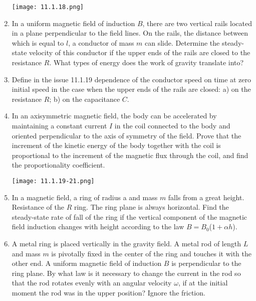 \documentclass{article}
\begin{document}
\begin{enumerate}[label=11.1.\arabic*]
\begin{center}
    \texttt{[image: 11.1.18.png]}
\end{center}

\item In a uniform magnetic field of induction $B$, there are two vertical rails located in a plane perpendicular to the field lines. On the rails, the distance between which is equal to $l$, a conductor of mass $m$ can slide. Determine the steady-state velocity of this conductor if the upper ends of the rails are closed to the resistance $R$. What types of energy does the work of gravity translate into?

\item Define in the issue 11.1.19 dependence of the conductor speed on time at zero initial speed in the case when the upper ends of the rails are closed: a) on the resistance $R$; b) on the capacitance $C$.

\item In an axisymmetric magnetic field, the body can be accelerated by maintaining a constant current $I$ in the coil connected to the body and oriented perpendicular to the axis of symmetry of the field. Prove that the increment of the kinetic energy of the body together with the coil is proportional to the increment of the magnetic flux through the coil, and find the proportionality coefficient.

\begin{center}
    \texttt{[image: 11.1.19-21.png]}
\end{center}

\item In a magnetic field, a ring of radius a and mass $m$ falls from a great height. Resistance of the $R$ ring. The ring plane is always horizontal. Find the steady-state rate of fall of the ring if the vertical component of the magnetic field induction changes with height according to the law $B = B_0$($1+\alpha h$).

\item A metal ring is placed vertically in the gravity field. A metal rod of length $L$ and mass $m$ is pivotally fixed in the center of the ring and touches it with the other end. A uniform magnetic field of induction $B$ is perpendicular to the ring plane. By what law is it necessary to change the current in the rod so that the rod rotates evenly with an angular velocity $\omega$, if at the initial moment the rod was in the upper position? Ignore the friction.


\end{enumerate}
\end{document}

